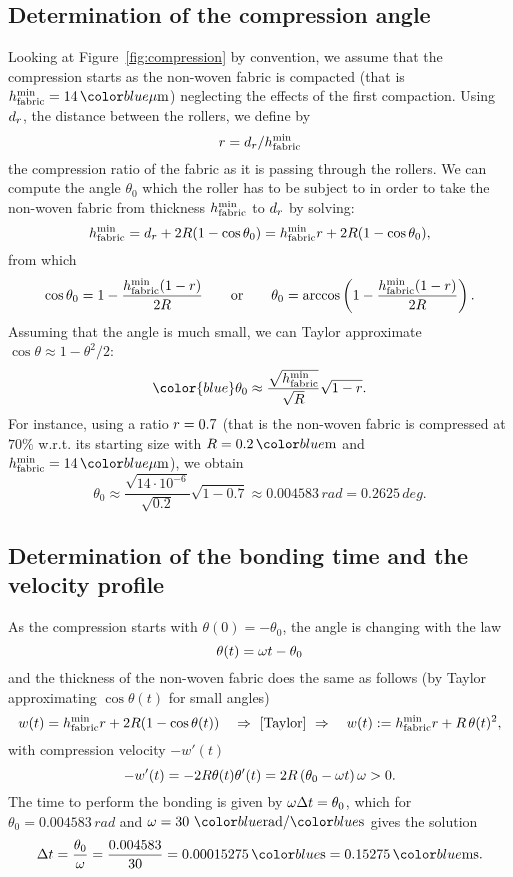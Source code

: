 \subsection{Determination of the compression angle}
Looking at Figure~\ref{fig:compression} by convention, we assume that the compression starts as the non-woven fabric is compacted (that is $\htissuemin=14\,\unit{$\mu$m}$) neglecting the effects of the first compaction. Using $d_r$, the distance between the rollers, we define by
\[
  r = d_r/h_{\mathrm{fabric}}^{\min}
\]
the compression ratio of the fabric as it is passing through the rollers. We can compute the angle $\theta_0$ which the roller has to be subject to in order to take the non-woven fabric from thickness $h_{\mathrm{fabric}}^{\min}$ to $d_r$ by solving:
\[
    h_{\mathrm{fabric}}^{\min} = d_r + 2R(1-\cos\theta_0) = h_{\mathrm{fabric}}^{\min} r + 2R(1-\cos\theta_0),
\]
from which
\[
   \cos\theta_0 = 1- \dfrac{h_{\mathrm{fabric}}^{\min}(1-r)}{2R}\qquad \textrm{or}
   \qquad
   \theta_0 = \arccos\left( 1- \dfrac{h_{\mathrm{fabric}}^{\min}(1-r)}{2R}\right).
\]
Assuming that the angle is much small, we can Taylor approximate $\cos\theta\approx 1-\theta^2/2$:
\begin{equation}\label{eq:theta0}
   \color{blue}
   \theta_0 \approx \dfrac{\sqrt{\htissuemin}}{\sqrt{\Roller}}\sqrt{1-\cratio}.
\end{equation}
For instance, using a ratio $r=0.7$ (that is the non-woven fabric is compressed at $70\%$ w.r.t. its starting size with $\Roller=0.2\,\unit{m}$ and $\htissuemin=14\,\unit{$\mu$m}$), we obtain
\[
   \theta_0 \approx \dfrac{\sqrt{14\cdot10^{-6}}}{\sqrt{0.2}}\sqrt{1-0.7}\approx 0.004583 \,\unit{rad} = 0.2625\,\unit{deg}.
\]

\subsection{Determination of the bonding time and the velocity profile}
As the compression starts with $\theta(0) = -\theta_0$, the angle is changing with the law
\begin{equation}\label{eq:theta:t}
   \theta(t) = \omega t - \theta_0
\end{equation}
and the thickness of the non-woven fabric does the same as follows (by Taylor approximating $\cos \theta(t)$ for small angles)
\[
    w(t) = \htissuemin \cratio + 2\Roller(1-\cos \theta(t))\quad\Rightarrow\ \textrm{[Taylor]}\ \Rightarrow\quad
    w(t) := \htissuemin \cratio + \Roller\,\theta(t)^2,
\]
with compression velocity $-w'(t)$
\[
  -w'(t) = -2R\theta(t)\theta'(t)
         = 2R\left(\theta_0-\omega t\right)\omega > 0.
\]
The time to perform the bonding is given by $\omega \Delta t = \theta_0$, which for $\theta_0=0.004583 \,\unit{rad}$ and $\VRot=30 \ \unit{rad}/\unit{s}$
gives the solution
\[
    \Delta t  = \dfrac{\theta_0}{\VRot} =  \dfrac{0.004583}{30} = 0.00015275\,\unit{s} =  0.15275\,\unit{ms}.
\]

